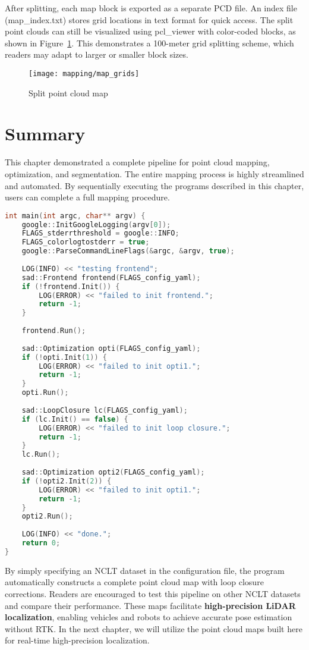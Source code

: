 After splitting, each map block is exported as a separate PCD file. An index file (map\_index.txt) stores grid locations in text format for quick access. The split point clouds can still be visualized using pcl\_viewer with color-coded blocks, as shown in Figure~\ref{fig:map-grids}. This demonstrates a 100-meter grid splitting scheme, which readers may adapt to larger or smaller block sizes.

\begin{figure}
	\centering
	\texttt{[image: mapping/map\_grids]}
	\caption{Split point cloud map}
	\label{fig:map-grids}
\end{figure}

\section{Summary}  
This chapter demonstrated a complete pipeline for point cloud mapping, optimization, and segmentation. The entire mapping process is highly streamlined and automated. By sequentially executing the programs described in this chapter, users can complete a full mapping procedure.  

\begin{lstlisting}[language=c++,caption=src/ch9/run_mapping.cc]  
int main(int argc, char** argv) {  
	google::InitGoogleLogging(argv[0]);  
	FLAGS_stderrthreshold = google::INFO;  
	FLAGS_colorlogtostderr = true;  
	google::ParseCommandLineFlags(&argc, &argv, true);  
	
	LOG(INFO) << "testing frontend";  
	sad::Frontend frontend(FLAGS_config_yaml);  
	if (!frontend.Init()) {  
		LOG(ERROR) << "failed to init frontend.";  
		return -1;  
	}  
	
	frontend.Run();  
	
	sad::Optimization opti(FLAGS_config_yaml);  
	if (!opti.Init(1)) {  
		LOG(ERROR) << "failed to init opti1.";  
		return -1;  
	}  
	opti.Run();  
	
	sad::LoopClosure lc(FLAGS_config_yaml);  
	if (lc.Init() == false) {  
		LOG(ERROR) << "failed to init loop closure.";  
		return -1;  
	}  
	lc.Run();  
	
	sad::Optimization opti2(FLAGS_config_yaml);  
	if (!opti2.Init(2)) {  
		LOG(ERROR) << "failed to init opti1.";  
		return -1;  
	}  
	opti2.Run();  
	
	LOG(INFO) << "done.";  
	return 0;  
}  
\end{lstlisting}  

By simply specifying an NCLT dataset in the configuration file, the program automatically constructs a complete point cloud map with loop closure corrections. Readers are encouraged to test this pipeline on other NCLT datasets and compare their performance. These maps facilitate \textbf{high-precision LiDAR localization}, enabling vehicles and robots to achieve accurate pose estimation without RTK. In the next chapter, we will utilize the point cloud maps built here for real-time high-precision localization.  


